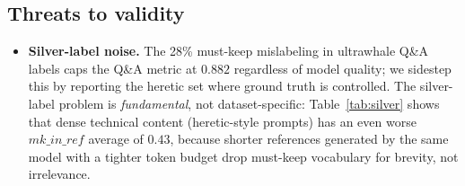 \subsection{Threats to validity}
\label{sec:threats}

\begin{itemize}
  \item \textbf{Silver-label noise.} The 28\% must-keep mislabeling in
        ultrawhale Q\&A labels caps the Q\&A metric at $0.882$ regardless of
        model quality; we sidestep this by reporting the heretic set where
        ground truth is controlled. The silver-label problem is
        \emph{fundamental}, not dataset-specific: Table~\ref{tab:silver}
        shows that dense technical content (heretic-style prompts) has an
        even worse $\mathit{mk\_in\_ref}$ average of $0.43$, because shorter
        references generated by the same model with a tighter token budget
        drop must-keep vocabulary for brevity, not irrelevance.


\end{itemize}
